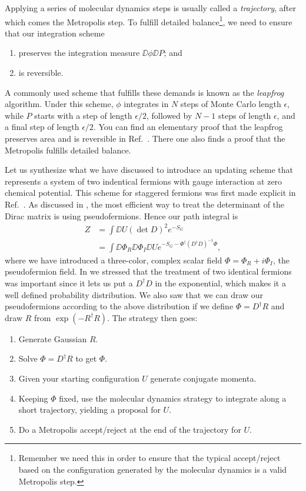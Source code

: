 Applying a series of molecular dynamics steps is usually called
a {\it trajectory}, after which comes the
Metropolis step. To fulfill detailed balance\footnote{Remember
we need this in order to ensure that the typical accept/reject
based on the configuration generated by the molecular dynamics
is a valid Metropolis step.}, we need to ensure
that our integration scheme
\begin{enumerate}
  \item preserves the integration measure $\DD\phi\DD P$; and
  \item is reversible.
\end{enumerate}
A commonly used scheme that fulfills these demands is known as the
{\it leapfrog} algorithm. Under this scheme, $\phi$ integrates
in $N$ steps of Monte Carlo length $\epsilon$, while $P$
starts with a step of length $\epsilon/2$, followed by $N-1$
steps of length $\epsilon$, and a final step of length $\epsilon/2$.
You can find an elementary proof that the leapfrog preserves area
and is reversible in Ref.~\cite{gattringer_quantum_2010}.
There one also finds a proof that the Metropolis fulfills detailed balance.

Let us synthesize what we have discussed to introduce an updating scheme that
represents a system of two indentical fermions with gauge interaction
at zero chemical potential.
This scheme for staggered fermions was first made explicit
in Ref.~\cite{gottlieb_hybrid-molecular-dynamics_1987}.
As discussed in , the most efficient way
to treat the determinant of the Dirac matrix is using pseudofermions.
Hence our path integral is
\begin{equation}\begin{aligned}\label{eq:twoFlavorRHMC}
Z&=\int\DD{U}\left(\det D\right)^2e^{-S_G}\\
&=
\int\DD{\Phi_R}\DD{\Phi_I}\DD{U} 
e^{-S_G-\Phi^\dagger\left(D^\dagger D\right)^{-1}\Phi},
\end{aligned}\end{equation}
where we have introduced a three-color, complex scalar field
$\Phi=\Phi_R+i\Phi_I$, the pseudofermion field.
In  we stressed that the treatment of two identical
fermions was important since it lets us put a $D^\dagger D$ in the
exponential, which makes it a well defined probability distribution.
We also saw that we can draw our pseudofermions according to the
above distribution if we define $\Phi=D^\dagger R$ and draw $R$ from
$\exp\left(-R^\dagger R\right)$. The strategy then goes:
\begin{enumerate}
\item Generate Gaussian $R$.
\item Solve $\Phi=D^\dagger R$ to get $\Phi$.
\item Given your starting configuration $U$ generate conjugate
momenta.
\item Keeping $\Phi$ fixed, use the molecular dynamics strategy
to integrate along a short trajectory, yielding a proposal for $U$.
\item Do a Metropolis accept/reject at the end of the trajectory for $U$.
\end{enumerate}

